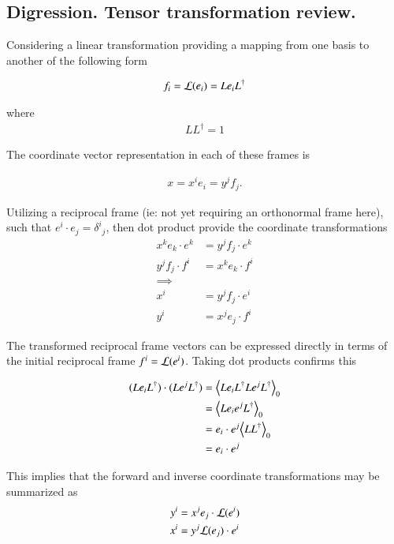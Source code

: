 \documentclass{article}
\begin{document}
\subsection{ Digression.  Tensor transformation review. }

Considering a linear transformation providing a mapping from one basis to another of the following form

\begin{align*}
f_i = \mathcal{L}(e_i) = L e_i L^\dagger
\end{align*}

where
\begin{align*}
L L^\dagger = 1
\end{align*}

The 
coordinate vector representation in each of these frames is

\begin{align*}
x = x^i e_i = y^j f_j.
\end{align*}

Utilizing a reciprocal frame (ie: not yet requiring an orthonormal frame here), such that $e^i \cdot e_j = {\delta^i}_j$, 
then dot product provide the coordinate transformations
\begin{align*}
x^k e_k \cdot e^k &= y^j f_j \cdot e^k \\
y^j f_j \cdot f^i &= x^k e_k \cdot f^i \\
\implies \\
x^i &= y^j f_j \cdot e^i \\
y^i &= x^j e_j \cdot f^i
\end{align*}

The transformed reciprocal frame vectors can be expressed directly in terms of the initial reciprocal frame $f^i = \mathcal{L}(e^i)$.  Taking
dot products confirms this

\begin{align*}
(L e_i L^\dagger) \cdot (L e^j L^\dagger) 
&= {\left\langle{{ L e_i L^\dagger L e^j L^\dagger }}\right\rangle}_{0} \\
&= {\left\langle{{ L e_i e^j L^\dagger }}\right\rangle}_{0} \\
&= e_i \cdot e^j {\left\langle{{ L L^\dagger }}\right\rangle}_{0} \\
&= e_i \cdot e^j
\end{align*}

This implies that the forward and inverse coordinate transformations may be summarized as
\begin{align*}
y^i &= x^j e_j \cdot \mathcal{L}(e^i) \\
x^i &= y^j \mathcal{L}(e_j) \cdot e^i \\
\end{align*}
\end{document}
